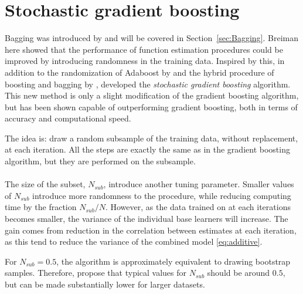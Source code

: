 \section{Stochastic gradient boosting}
\label{sec:Stochastic gradient boosting}
Bagging was introduced by \cite{Breiman1996} and will be covered in Section~\ref{sec:Bagging}. Breiman here showed that the performance of function estimation procedures could be improved by introducing randomness in the training data. 
Inspired by this, in addition to the randomization of Adaboost by \cite{freund1996} and the hybrid procedure of boosting and bagging by \cite{breiman1999}, \cite{FriedmanStochBoost} developed the \textit{stochastic gradient boosting} algorithm.
This new method is only a slight modification of the gradient boosting algorithm, but has been shown capable of outperforming gradient boosting, both in terms of accuracy and computational speed.  

The idea is: draw a random subsample of the training data, without replacement, at each iteration. All the steps are exactly the same as in the gradient boosting algorithm, but they are performed on the subsample. \\
\\
The size of the subset, $N_{sub}$, introduce another tuning parameter. Smaller values of $N_{sub}$ introduce more randomness to the procedure, while reducing computing time by the fraction $N_{sub}/N$. However, as the data trained on at each iterations becomes smaller, the variance of the individual base learners will increase. The gain comes from reduction in the correlation between estimates at each iteration, as this tend to reduce the variance of the combined model \eqref{eq:additive}.

For $N_{sub} = 0.5$, the algorithm is approximately equivalent to drawing bootstrap samples. Therefore, \cite{modstat} propose that typical values for $N_{sub}$ should be around $0.5$, but can be made substantially lower for larger datasets.

